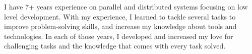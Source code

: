 

\begin{cvparagraph}

    I have 7+ years experience on parallel and distributed systems focusing on
    low level development. With my experience, I learned to tackle several tasks
    to improve problem-solving skills, and increase my knowledge about tools and
    technologies. In each of those years, I developed and increased my love for
    challenging tasks and the knowledge that comes with every task solved.

\end{cvparagraph}
